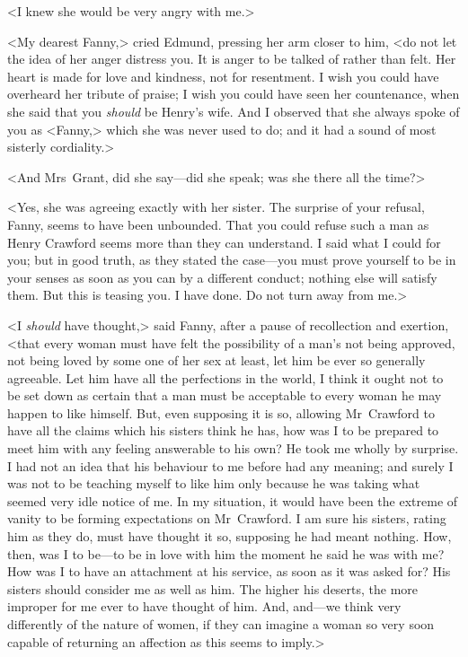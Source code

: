 <I knew she would be very angry with me.>

<My dearest Fanny,> cried Edmund, pressing her arm closer to him, <do not let the idea of her anger distress you. It is anger to be talked of rather than felt. Her heart is made for love and kindness, not for resentment. I wish you could have overheard her tribute of praise; I wish you could have seen her countenance, when she said that you \textit{should}  be Henry's wife. And I observed that she always spoke of you as <Fanny,> which she was never used to do; and it had a sound of most sisterly cordiality.>

<And Mrs~Grant, did she say—did she speak; was she there all the time?>

<Yes, she was agreeing exactly with her sister. The surprise of your refusal, Fanny, seems to have been unbounded. That you could refuse such a man as Henry Crawford seems more than they can understand. I said what I could for you; but in good truth, as they stated the case—you must prove yourself to be in your senses as soon as you can by a different conduct; nothing else will satisfy them. But this is teasing you. I have done. Do not turn away from me.>

<I \textit{should}  have thought,> said Fanny, after a pause of recollection and exertion, <that every woman must have felt the possibility of a man's not being approved, not being loved by some one of her sex at least, let him be ever so generally agreeable. Let him have all the perfections in the world, I think it ought not to be set down as certain that a man must be acceptable to every woman he may happen to like himself. But, even supposing it is so, allowing Mr~Crawford to have all the claims which his sisters think he has, how was I to be prepared to meet him with any feeling answerable to his own? He took me wholly by surprise. I had not an idea that his behaviour to me before had any meaning; and surely I was not to be teaching myself to like him only because he was taking what seemed very idle notice of me. In my situation, it would have been the extreme of vanity to be forming expectations on Mr~Crawford. I am sure his sisters, rating him as they do, must have thought it so, supposing he had meant nothing. How, then, was I to be—to be in love with him the moment he said he was with me? How was I to have an attachment at his service, as soon as it was asked for? His sisters should consider me as well as him. The higher his deserts, the more improper for me ever to have thought of him. And, and—we think very differently of the nature of women, if they can imagine a woman so very soon capable of returning an affection as this seems to imply.>


